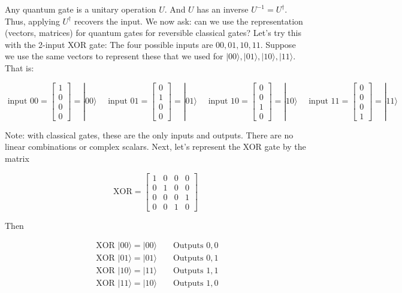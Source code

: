 \documentclass[main.tex]{subfiles}
\begin{document}
    Any quantum gate is a unitary operation $U$. And $U$ has an inverse $U^{-1}=U^{\dagger}$. Thus, applying $U^{\dagger}$ recovers the input. We now ask: can we use the representation (vectors, matrices) for quantum gates for reversible classical gates? Let's try this with the 2-input XOR gate: The four possible inputs are $00,01,10,11$. Suppose we use the same vectors to represent these that we used for $|00\rangle,|01\rangle,|10\rangle,|11\rangle$. That is:
    
    $$
    \text { input } 00=\left[\begin{array}{l}
    1 \\
    0 \\
    0 \\
    0
    \end{array}\right]=|00\rangle \quad \text { input } 01=\left[\begin{array}{l}
    0 \\
    1 \\
    0 \\
    0
    \end{array}\right]=|01\rangle \quad \text { input } 10=\left[\begin{array}{l}
    0 \\
    0 \\
    1 \\
    0
    \end{array}\right]=|10\rangle \quad \text { input } 11=\left[\begin{array}{l}
    0 \\
    0 \\
    0 \\
    1
    \end{array}\right]=|11\rangle
    $$
    
    Note: with classical gates, these are the only inputs and outputs. There are no linear combinations or complex scalars. Next, let's represent the XOR gate by the matrix
    
    $$
    \mathrm{XOR}=\left[\begin{array}{llll}
    1 & 0 & 0 & 0 \\
    0 & 1 & 0 & 0 \\
    0 & 0 & 0 & 1 \\
    0 & 0 & 1 & 0
    \end{array}\right]
    $$
    
    Then
    
    $$
    \begin{array}{lll}
    \text { XOR }|00\rangle=|00\rangle & & \text { Outputs } 0,0 \\
    \text { XOR }|01\rangle=|01\rangle & & \text { Outputs } 0,1 \\
    \text { XOR }|10\rangle=|11\rangle & & \text { Outputs } 1,1 \\
    \text { XOR }|11\rangle=|10\rangle & & \text { Outputs } 1,0
    \end{array}
    $$
    
\end{document}
